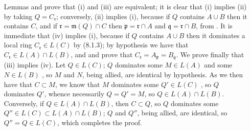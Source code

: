 \documentclass[../main.tex]{subfiles}
\begin{document}
Lemmas  and  prove that (i) and (iii) are equivalent; it is clear that (i) implies (ii) by taking $Q=C_\mathfrak{r}$; conversely, (ii) implies (i), because if $Q$ contains $A\cup B$ then it contains $C$, and if $\mathfrak{r}=\mathfrak{m}(Q)\cap C$ then $\mathfrak{p}=\mathfrak{r}\cap A$ and $\mathfrak{q}=\mathfrak{r}\cap B$, from .
It is immediate that (iv) implies (i), because if $Q$ contains $A\cup B$ then it dominates a local ring $C_\mathfrak{r}\in L(C)$ by (8.1.3); by hypothesis we have that $C_\mathfrak{r}\in L(A)\cap L(B)$, and  and  prove that $C_\mathfrak{r}=A_\mathfrak{p}=B_\mathfrak{q}$.
We prove finally that (iii) implies (iv).
Let $Q\in L(C)$; $Q$ dominates some $M\in L(A)$ and some $N\in L(B)$ , so $M$ and $N$, being allied, are identical by hypothesis.
As we then have that $C\subset M$, we know that $M$ dominates some $Q'\in L(C)$ , so $Q$ dominates $Q'$, whence necessarily  $Q=Q'=M$, so $Q\in L(A)\cap L(B)$.
Conversely, if $Q\in L(A)\cap L(B)$, then $C\subset Q$, so  $Q$ dominates some $Q''\in L(C)\subset L(A)\cap L(B)$; $Q$ and $Q''$, being allied, are identical, so $Q''=Q\in L(C)$, which completes the proof.
\end{document}
